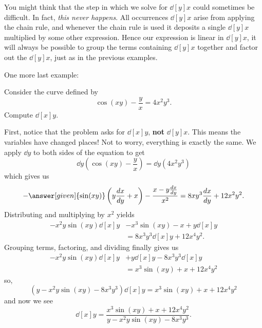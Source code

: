 \documentclass{ximera}
\begin{document}
\begin{example}
\begin{explanation}
\begin{image}
\end{image}
\end{explanation}

\end{example}


You might think that the step in which we solve for $\dd[y]{x}$ could
sometimes be difficult. In fact, \textit{this never happens}. All
occurrences $\dd[y]{x}$ arise from applying the chain rule, and
whenever the chain rule is used it deposits a single $\dd[y]{x}$
multiplied by some other expression. Hence our expression is linear in
$\dd[y]{x}$, it will always be possible to group the terms containing
$\dd[y]{x}$ together and factor out the $\dd[y]{x}$, just as in the
previous examples.

One more last example:

\begin{example}
Consider the curve defined by
\[
\cos(xy) - \frac{y}{x} = 4x^2 y^3.
\]
Compute $\dd[x]{y}$.
\begin{explanation}
First, notice that the problem asks for $\dd[x]{y}$, \textbf{not}
$\dd[y]{x}$. This
means the variables have changed places!  Not to worry, everything is
exactly the same.  We apply $\dd{y}$ to both sides of the equation to
get
\[
\dd{y} \left( \cos(xy) - \frac{y}{x} \right) = \dd{y} (4x^2 y^3)
\]
which gives us
\[
-\answer[given]{\sin(xy)} \left(y \dd[x]{y} + x \right) - \frac{x - y \dd[x]{y}}{x^2}
= 8xy^3 \dd[x]{y} + 12 x^2 y^2.
\]
Distributing and multiplying by $x^2$ yields
\begin{align*}
  -x^2 y \sin(xy) \dd[x]{y} &- x^3 \sin(xy) - x + y \dd[x]{y}\\
  &= 8x^3y^3 \dd[x]{y} + 12x^4y^2.
\end{align*}
Grouping terms, factoring, and dividing finally gives us
\begin{align*}
  -x^2 y \sin(xy) \dd[x]{y} &+ y \dd[x]{y} - 8x^3y^3 \dd[x]{y} \\
  &= x^3 \sin(xy) + x + 12x^4 y^2
\end{align*}
so,
\[
\left( y - x^2y\sin(xy) - 8x^3 y^3 \right) \dd[x]{y} = x^3 \sin(xy) + x + 12x^4 y^2 
\]
and now we see
\[
\dd[x]{y} = \frac{x^3 \sin(xy) + x + 12x^4 y^2}{y - x^2y\sin(xy) - 8x^3 y^3}.
\]
\end{explanation}
\end{example}
\end{document}
